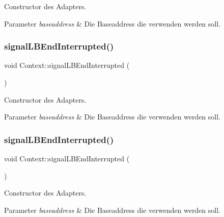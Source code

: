 Constructor des Adapters.


\begin{DoxyParams}{Parameter}
{\em baseaddress} & Die Baseaddress die verwenden werden soll. \\
\hline
\end{DoxyParams}
\hypertarget{class_context_a9e9d5d85cafe8b295193f01fd2b7a8ee}{}\label{class_context_a9e9d5d85cafe8b295193f01fd2b7a8ee} 
\subsubsection{\texorpdfstring{signal\+L\+B\+End\+Interrupted()}{signalLBEndInterrupted()}\hspace{0.1cm}{\footnotesize\ttfamily [1/2]}}
{\footnotesize\ttfamily void Context\+::signal\+L\+B\+End\+Interrupted (\begin{DoxyParamCaption}{ }\end{DoxyParamCaption})}

Constructor des Adapters.


\begin{DoxyParams}{Parameter}
{\em baseaddress} & Die Baseaddress die verwenden werden soll. \\
\hline
\end{DoxyParams}
\hypertarget{class_context_a9e9d5d85cafe8b295193f01fd2b7a8ee}{}\label{class_context_a9e9d5d85cafe8b295193f01fd2b7a8ee} 
\subsubsection{\texorpdfstring{signal\+L\+B\+End\+Interrupted()}{signalLBEndInterrupted()}\hspace{0.1cm}{\footnotesize\ttfamily [2/2]}}
{\footnotesize\ttfamily void Context\+::signal\+L\+B\+End\+Interrupted (\begin{DoxyParamCaption}{ }\end{DoxyParamCaption})}

Constructor des Adapters.


\begin{DoxyParams}{Parameter}
{\em baseaddress} & Die Baseaddress die verwenden werden soll. \\
\hline
\end{DoxyParams}
\hypertarget{class_context_a6debf81836f13909119658b40e32fe1c}{}\label{class_context_a6debf81836f13909119658b40e32fe1c} 
